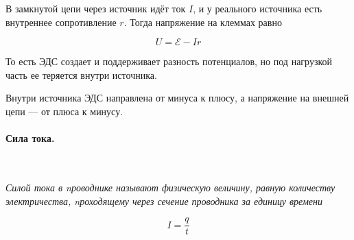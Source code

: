 \documentclass[a4paper,12pt]{article}
\begin{document}
		В замкнутой цепи через источник идёт ток $I$, и у реального источника есть внутреннее 
		сопротивление $r$. Тогда напряжение на клеммах равно

		\begin{equation*}
			U = \mathcal{E} - Ir
		\end{equation*}

		То есть ЭДС создает и поддерживает разность потенциалов, но под нагрузкой часть ее 
		теряется внутри источника.
		
		Внутри источника ЭДС направлена от минуса к плюсу, а напряжение на внешней цепи — от 
		плюса к минусу.

		\paragraph{Сила тока.} \

		\textit{Силой тока в nроводнике называют физическую величину, равную количеству электричества,
		nроходящему через сечение про­водника за единицу времени}

		\begin{equation}
			I = \frac{q}{t}
		\end{equation}

		
\end{document}
